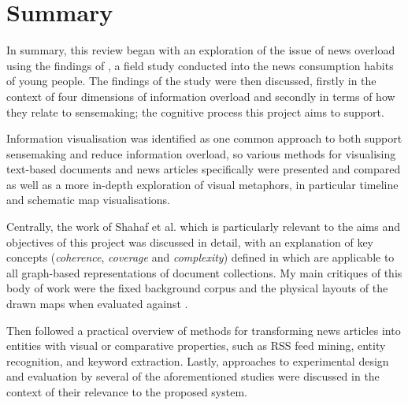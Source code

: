 \section{Summary}
In summary, this review began with an exploration of the issue of news overload using the findings of \citep{anewmodelfornews}, a field study conducted into the news consumption habits of young people. The findings of the study were then discussed, firstly in the context of four dimensions of information overload \citep{TowardsAnOptimalResolutionToInformationOverload, GuestEditorsIntroductionInformationOverload} and secondly in terms of how they relate to sensemaking; the cognitive process this project aims to support.

Information visualisation was identified as one common approach to both support sensemaking and reduce information overload, so various methods for visualising text-based documents and news articles specifically were presented and compared \citep{ESTHETE, ThemeRiver, InteractiveTopicBasedVisualTextSummarizationAndAnalysis, ExploringLongRunningNewsStoriesUsingWikipedia, Nreader} as well as a more in-depth exploration of visual metaphors, in particular timeline and schematic map visualisations.

Centrally, the work of Shahaf et al. \citep{ConnectingTheDots, GeneratingInformationMaps, MetroMapsOfScience, InformationCartographyPre} which is particularly relevant to the aims and objectives of this project was discussed in detail, with an explanation of key concepts (\textit{coherence}, \textit{coverage} and \textit{complexity}) defined in \citep{GeneratingInformationMaps} which are applicable to all graph-based representations of document collections. My main critiques of this body of work were the fixed background corpus and the physical layouts of the drawn maps when evaluated against \citep{TheBasisForGraphDrawingAlgorithms, AutomaticMetroMapLayout}.

Then followed a practical overview of methods for transforming news articles into entities with visual or comparative properties, such as RSS feed mining, entity recognition, and keyword extraction. Lastly, approaches to experimental design and evaluation by several of the aforementioned studies were discussed in the context of their relevance to the proposed system.